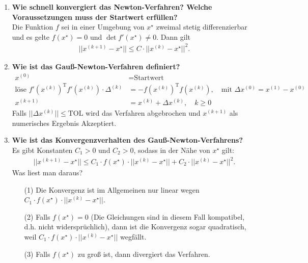 \begin{enumerate}
		\item \textbf{Wie schnell konvergiert das Newton-Verfahren? Welche Voraussetzungen muss der Startwert erfüllen?} \\
			Die Funktion \(f\) sei in einer Umgebung von \(x^\star\) zweimal stetig differenzierbar und es gelte \(f(x^\star) =0\) und \(\det f'(x^\star)\neq 0\). Dann gilt
			\begin{align*}
				||x^{(k+1)}-x^\star||\leq C\cdot ||x^{(k)}-x^\star||^2.
			\end{align*}
		
		\item \textbf{Wie ist das Gauß-Newton-Verfahren definiert?}
			\begin{align*}
			x^{(0)} &= \text{Startwert} \\
			\text{löse } f'(x^{(k)})^\text{T}f'(x^{(k)}) \cdot \Delta^{(k)} &= -f(x^{(k)})^\text{T}f(x^{(k)}), \quad \text{mit } \Delta x^{(0)}=x^{(1)}-x^{(0)} \\
			x^{(k+1)} &= x^{(k)} +  \Delta x^{(k)}, \quad k\geq 0
			\end{align*}
			Falls \(||\Delta x^{(k)}||\leq\text{TOL} \) wird das Verfahren abgebrochen und \(x^{(k+1)}\) als numerisches Ergebnis Akzeptiert.
		
		\item \textbf{Wie ist das Konvergenzverhalten des Gauß-Newton-Verfahrens?} \\
			Es gibt Konstanten \(C_1>0\) und \(C_2>0\), sodass in der Nähe von \(x^\star\) gilt:
			\begin{align*}
				||x^{(k+1)}-x^\star||\leq C_1\cdot f(x^\star)\cdot ||x^{(k)}-x^\star|| + C_2\cdot ||x^{(k)}-x^\star||^2.
			\end{align*}
			Was liest man daraus?
			\begin{enumerate}
				\item[(1)] Die Konvergenz ist im Allgemeinen nur linear wegen \(C_1\cdot f(x^\star)\cdot ||x^{(k)}-x^\star||\).
				\item[(2)] Falls \(f(x^\star)=0\) (Die Gleichungen sind in diesem Fall kompatibel, d.h. nicht widersprüchlich), dann ist die Konvergenz sogar quadratisch, weil \(C_1\cdot f(x^\star)\cdot ||x^{(k)}-x^\star||\) wegfällt.
				\item[(3)] Falls \(f(x^\star)\) zu groß ist, dann divergiert das Verfahren.
			\end{enumerate}
		
	\end{enumerate}